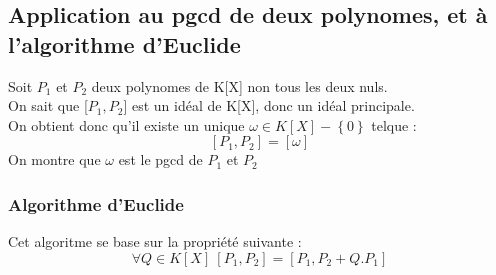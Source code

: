 \subsection{Application au pgcd de deux polynomes, et à l'algorithme d'Euclide}
Soit $P_1$ et $P_2$ deux polynomes de K[X] non tous les deux nuls.\\
On sait que [$P_1,P_2$] est un idéal de K[X], donc un idéal principale.\\
On obtient donc qu'il existe un unique $\omega \in K[X] - \left\lbrace 0 \right\rbrace $ telque : 
$$[P_1,P_2] = [\omega]$$
On montre que $\omega$ est le pgcd de $P_1$ et $P_2$
\subsubsection{Algorithme d'Euclide}
Cet algoritme se base sur la propriété suivante : 
$$\forall Q \in K[X] ~ [P_1,P_2] = [P_1,P_2 + Q.P_1]$$
